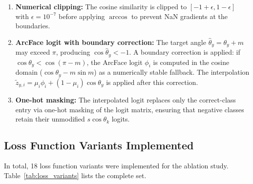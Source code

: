 \begin{enumerate}
    \item \textbf{Numerical clipping:} The cosine similarity is clipped to $[-1 + \epsilon, 1 - \epsilon]$ with $\epsilon = 10^{-7}$ before applying $\arccos$ to prevent NaN gradients at the boundaries.

    \item \textbf{ArcFace logit with boundary correction:} The target angle $\hat{\theta}_y = \theta_y + m$ may exceed $\pi$, producing $\cos\hat{\theta}_y < -1$. A boundary correction is applied: if $\cos\theta_y < \cos(\pi - m)$, the ArcFace logit $\phi_i$ is computed in the cosine domain ($\cos\theta_y - m \sin m$) as a numerically stable fallback. The interpolation $\tilde{z}_{y,i} = \mu_i \phi_i + (1-\mu_i) \cos\theta_y$ is applied after this correction.

    \item \textbf{One-hot masking:} The interpolated logit replaces only the correct-class entry via one-hot masking of the logit matrix, ensuring that negative classes retain their unmodified $s \cos\theta_k$ logits.
\end{enumerate}

\subsection{Loss Function Variants Implemented}
\label{sec:impl:pattern:losses}

In total, 18 loss function variants were implemented for the ablation study.
Table~\ref{tab:loss_variants} lists the complete set.

